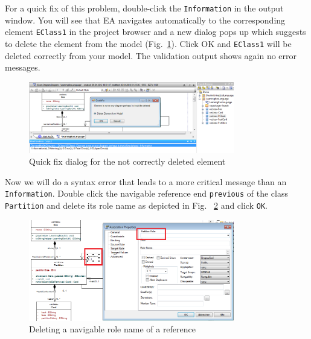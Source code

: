 For a quick fix of this problem, double-click the \texttt{Information} in the
output window. You will see that EA navigates automatically to the
corresponding element \texttt{EClass1} in the project browser and a new dialog
pops up which suggests to delete the element from the model
(Fig.~\ref{fig:quick-fix1}).
Click OK and \texttt{EClass1} will be deleted correctly from your model. The validation output
shows again no error messages.

\begin{figure}[htbp]
	\centering 
  \includegraphics[width=0.8\textwidth]{pics/memBoxBilder/memBox45} 
	\caption{Quick fix dialog for the not correctly deleted element}
	\label{fig:quick-fix1}
\end{figure}

Now we will do a syntax error that leads to a more critical message than an
\texttt{Information}. Double click the navigable reference end \texttt{previous}
of the class \texttt{Partition} and delete its role name as depicted in Fig.
~\ref{fig:delete-role-name} and click \texttt{OK}.

\begin{figure}[htbp]
	\centering
  \includegraphics[width=0.8\textwidth]{pics/memBoxBilder/memBox46} 
	\caption{Deleting a navigable role name of a reference}
	\label{fig:delete-role-name}
\end{figure}

